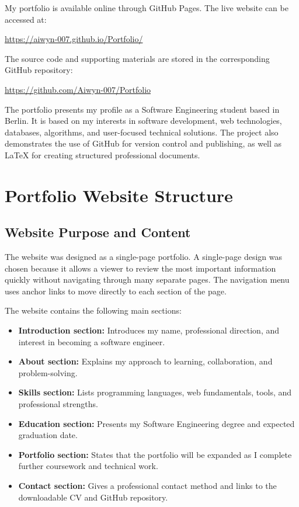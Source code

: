 \documentclass[12pt, a4paper]{article}
\begin{document}
My portfolio is available online through GitHub Pages. The live website can be
accessed at:

\begin{center}
\url{https://aiwyn-007.github.io/Portfolio/}
\end{center}

The source code and supporting materials are stored in the corresponding
GitHub repository:

\begin{center}
\url{https://github.com/Aiwyn-007/Portfolio}
\end{center}

The portfolio presents my profile as a Software Engineering student based in
Berlin. It is based on my interests in software development, web technologies,
databases, algorithms, and user-focused technical solutions. The project also
demonstrates the use of GitHub for version control and publishing, as well as
LaTeX for creating structured professional documents.

\section{Portfolio Website Structure}

\subsection{Website Purpose and Content}

The website was designed as a single-page portfolio. A single-page design was
chosen because it allows a viewer to review the most important information
quickly without navigating through many separate pages. The navigation menu
uses anchor links to move directly to each section of the page.

The website contains the following main sections:

\begin{itemize}
    \item \textbf{Introduction section:} Introduces my name, professional
    direction, and interest in becoming a software engineer.
    \item \textbf{About section:} Explains my approach to learning,
    collaboration, and problem-solving.
    \item \textbf{Skills section:} Lists programming languages, web
    fundamentals, tools, and professional strengths.
    \item \textbf{Education section:} Presents my Software Engineering
    degree and expected graduation date.
    \item \textbf{Portfolio section:} States that the portfolio will be
    expanded as I complete further coursework and technical work.
    \item \textbf{Contact section:} Gives a professional contact method and
    links to the downloadable CV and GitHub repository.
\end{itemize}
\end{document}
